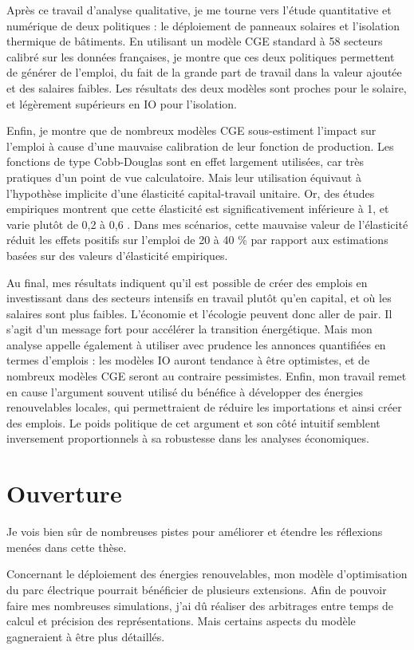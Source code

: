 Après ce travail d'analyse qualitative, je me tourne vers l'étude quantitative et numérique de deux politiques : le déploiement de panneaux solaires et l'isolation thermique de bâtiments. 
En utilisant un modèle CGE standard à 58 secteurs calibré sur les données françaises, je montre que ces deux politiques permettent de générer de l'emploi, du fait de la grande part de travail dans la valeur ajoutée et des salaires faibles. Les résultats des deux modèles sont proches pour le solaire, et légèrement supérieurs en IO pour l'isolation.

Enfin, je montre que de nombreux modèles CGE sous-estiment l’impact sur l’emploi à cause d'une mauvaise calibration de leur fonction de production. Les fonctions de type Cobb-Douglas sont en effet largement utilisées, car très pratiques d’un point de vue calculatoire. Mais leur utilisation équivaut à l'hypothèse implicite d’une élasticité capital-travail unitaire. Or, des études empiriques montrent que cette élasticité est significativement inférieure à 1, et varie plutôt de 0,2 à 0,6 \citep{VanderWerf2008}. Dans mes scénarios, cette mauvaise valeur de l’élasticité réduit les effets positifs sur l’emploi de 20 à 40 \% par rapport aux estimations basées sur des valeurs d'élasticité empiriques. 

Au final, mes résultats indiquent qu’il est possible de créer des emplois en investissant dans des secteurs intensifs en travail plutôt qu’en capital, et où les salaires sont plus faibles. L'économie et l'écologie peuvent donc aller de pair. Il s’agit d’un message fort pour accélérer la transition énergétique.
Mais mon analyse appelle également à utiliser avec prudence les annonces quantifiées en termes d’emplois : les modèles IO auront tendance à être optimistes, et de nombreux modèles CGE seront au contraire pessimistes.
Enfin, mon travail remet en cause l’argument souvent utilisé du bénéfice à développer des énergies renouvelables locales, qui permettraient de réduire les importations et ainsi créer des emplois. Le poids politique de cet argument et son côté intuitif semblent inversement proportionnels à sa robustesse dans les analyses économiques.


\section{Ouverture}

Je vois bien sûr de nombreuses pistes pour améliorer et étendre les réflexions menées dans cette thèse. 

Concernant le déploiement des énergies renouvelables, mon modèle d'optimisation du parc électrique pourrait bénéficier de plusieurs extensions. Afin de pouvoir faire mes nombreuses simulations, j’ai dû réaliser des arbitrages entre temps de calcul et précision des représentations. Mais certains aspects du modèle gagneraient à être plus détaillés.


